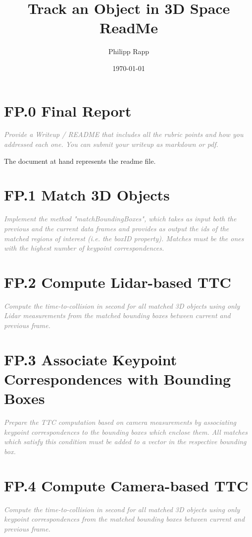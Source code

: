 \documentclass[a4paper]{scrartcl}
\title{Track an Object in 3D Space ReadMe}
\author{Philipp Rapp}
\date{\today}
\begin{document}
\maketitle

\section*{FP.0 Final Report}
\textcolor{gray}{\textit{Provide a Writeup / README that includes all the rubric points and how you addressed each one. You can submit your writeup as markdown or pdf.}}

The document at hand represents the readme file.

\section*{FP.1 Match 3D Objects}
\textcolor{gray}{\textit{Implement the method "matchBoundingBoxes", which takes as input both the previous and the current data frames and provides as output the ids of the matched regions of interest (i.e. the boxID property). Matches must be the ones with the highest number of keypoint correspondences.}}

\section*{FP.2 Compute Lidar-based TTC}
\textcolor{gray}{\textit{Compute the time-to-collision in second for all matched 3D objects using only Lidar measurements from the matched bounding boxes between current and previous frame. }}

\section*{FP.3 Associate Keypoint Correspondences with Bounding Boxes}
\textcolor{gray}{\textit{Prepare the TTC computation based on camera measurements by associating keypoint correspondences to the bounding boxes which enclose them. All matches which satisfy this condition must be added to a vector in the respective bounding box.}}

\section*{FP.4 Compute Camera-based TTC}
\textcolor{gray}{\textit{Compute the time-to-collision in second for all matched 3D objects using only keypoint correspondences from the matched bounding boxes between current and previous frame.}}
\end{document}
